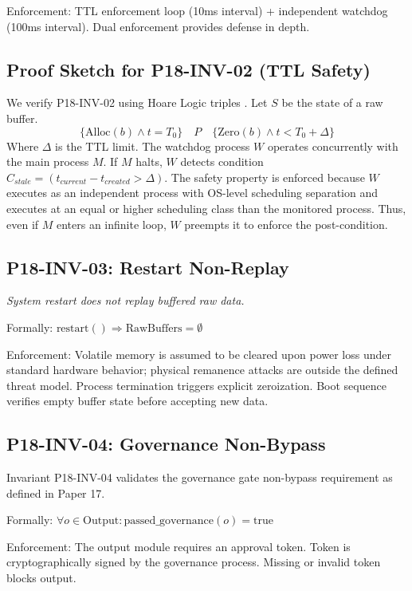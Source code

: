 \documentclass[conference]{IEEEtran}
\begin{document}
Enforcement: TTL enforcement loop (10ms interval) + independent watchdog (100ms interval). Dual enforcement provides defense in depth.

\subsection{Proof Sketch for P18-INV-02 (TTL Safety)}
We verify P18-INV-02 using Hoare Logic triples \cite{b19}. Let $S$ be the state of a raw buffer.
\begin{equation}
\{ \text{Alloc}(b) \land t = T_0 \} \quad P \quad \{ \text{Zero}(b) \land t < T_0 + \Delta \}
\end{equation}
Where $\Delta$ is the TTL limit.
The watchdog process $W$ operates concurrently with the main process $M$.
If $M$ halts, $W$ detects condition $C_{stale} = (t_{current} - t_{created} > \Delta)$.
The safety property is enforced because $W$ executes as an independent process with OS-level scheduling separation and executes at an equal or higher scheduling class than the monitored process. Thus, even if $M$ enters an infinite loop, $W$ preempts it to enforce the post-condition.

\subsection{P18-INV-03: Restart Non-Replay}
\textit{System restart does not replay buffered raw data.}

Formally: $\text{restart}() \Rightarrow \text{RawBuffers} = \emptyset$

Enforcement: Volatile memory is assumed to be cleared upon power loss under standard hardware behavior; physical remanence attacks are outside the defined threat model. Process termination triggers explicit zeroization. Boot sequence verifies empty buffer state before accepting new data.

\subsection{P18-INV-04: Governance Non-Bypass}
Invariant P18-INV-04 validates the governance gate non-bypass requirement as defined in Paper 17.

Formally: $\forall o \in \text{Output}: \text{passed\_governance}(o) = \text{true}$

Enforcement: The output module requires an approval token. Token is cryptographically signed by the governance process. Missing or invalid token blocks output.
\end{document}
